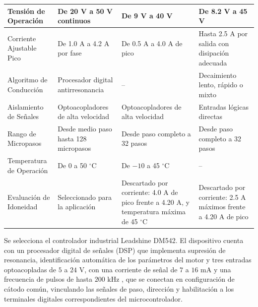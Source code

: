 \documentclass[../../General.tex]{subfiles}
\begin{document}
\begin{center}
\begin{xltabular}{\textwidth}{|p{3.2cm}|>{\centering\arraybackslash}X|>{\centering\arraybackslash}X|>{\centering\arraybackslash}X|}
        \hline
        \endlastfoot
        Tensión de Operación & De 20 V a 50 V continuos & De 9 V a 40 V \citep{handson_tb6600} & De 8.2 V a 45 V \citep{ti_drv8825} \\
        \hline
        Corriente Ajustable Pico & De 1.0 A a 4.2 A por fase & De 0.5 A a 4.0 A de pico \citep{handson_tb6600} & Hasta 2.5 A por salida con disipación adecuada \citep{ti_drv8825} \\
        \hline
        Algoritmo de Conducción & Procesador digital antirresonancia & -- & Decaimiento lento, rápido o mixto \citep{ti_drv8825} \\
        \hline
        Aislamiento de Señales & Optoacopladores de alta velocidad & Optoacopladores de alta velocidad \citep{handson_tb6600} & Entradas lógicas directas \\
        \hline
        Rango de Micropasos & Desde medio paso hasta 128 micropasos & Desde paso completo a 32 pasos & Desde paso completo a 32 pasos \\
        \hline
        Temperatura de Operación & De 0 a 50 $^\circ$C \citep{leadshine_dm542} & De $-10$ a 45 $^\circ$C \citep{handson_tb6600} & -- \\
        \hline
        Evaluación de Idoneidad & Seleccionado para la aplicación & Descartado por corriente: 4.0 A de pico frente a 4.20 A, y temperatura máxima de 45 $^\circ$C & Descartado por corriente: 2.5 A máximos frente a 4.20 A de pico \\
        \hline
    \end{xltabular}
\end{center}

Se selecciona el controlador industrial Leadshine DM542. El dispositivo cuenta con un procesador digital de señales (DSP) que implementa supresión de resonancia, identificación automática de los parámetros del motor y tres entradas optoacopladas de $5$ a $24\text{ V}$, con una corriente de señal de $7$ a $16\text{ mA}$ y una frecuencia de pulsos de hasta $200\text{ kHz}$ \citep{leadshine_dm542}, que se conectan en configuración de cátodo común, vinculando las señales de paso, dirección y habilitación a los terminales digitales correspondientes del microcontrolador.
\end{document}
